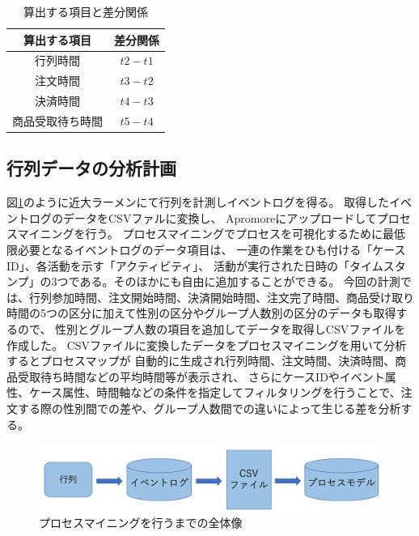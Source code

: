 \documentclass{jsarticle}
\begin{document}
\begin{table}[H]
 \begin{center}
   \caption{算出する項目と差分関係}
   \begin{tabular}{|c|c|} \hline
算出する項目 & 差分関係 \\ \hline \hline
行列時間 & $t2-t1$ \\ \hline
注文時間 & $t3-t2$ \\ \hline
決済時間 & $t4-t3$ \\ \hline
商品受取待ち時間 & $t5-t4$ \\ \hline
  \end{tabular}
 \label{table4}
 \end{center}
\end{table}





\newpage
\subsection{行列データの分析計画}
図\ref{fig:5}のように近大ラーメンにて行列を計測しイベントログを得る。
取得したイベントログのデータをCSVファルに変換し、
Apromoreにアップロードしてプロセスマイニングを行う。
プロセスマイニングでプロセスを可視化するために最低限必要となるイベントログのデータ項目は、
一連の作業をひも付ける「ケースID」、各活動を示す「アクティビティ」、
活動が実行された日時の「タイムスタンプ」の3つである。そのほかにも自由に追加することができる。
今回の計測では、行列参加時間、注文開始時間、決済開始時間、注文完了時間、商品受け取り時間の5つの区分に加えて性別の区分やグループ人数別の区分のデータも取得するので、
性別とグループ人数の項目を追加してデータを取得しCSVファイルを作成した。
CSVファイルに変換したデータをプロセスマイニングを用いて分析するとプロセスマップが
自動的に生成され行列時間、注文時間、決済時間、商品受取待ち時間などの平均時間等が表示され、
さらにケースIDやイベント属性、ケース属性、時間軸などの条件を指定してフィルタリングを行うことで、注文する際の性別間での差や、グループ人数間での違いによって生じる差を分析する。

\begin{figure}[H]
  \centering
  \includegraphics[width=14.5cm]{5.png}
  \caption{プロセスマイニングを行うまでの全体像}
  \label{fig:5}
\end{figure}
\end{document}
